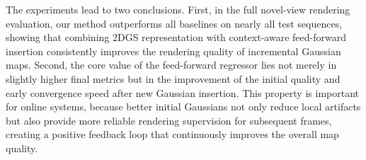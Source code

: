 \documentclass[letterpaper,journal]{IEEEtran}
\newcommand{\datasetname}[1]{\mbox{\normalfont\itshape #1}}
\begin{document}
\begin{table}[!t]
\centering
\caption{Ablation study on early convergence of the feed-forward regressor on \datasetname{hku\_campus\_00}. Values are averaged over valid training frames; bold indicates the better result at each step.}
\label{tab:ablation_curves}
\renewcommand{\arraystretch}{1.18}
\end{table}

The experiments lead to two conclusions. First, in the full novel-view rendering evaluation, our method outperforms all baselines on nearly all test sequences, showing that combining 2DGS representation with context-aware feed-forward insertion consistently improves the rendering quality of incremental Gaussian maps. Second, the core value of the feed-forward regressor lies not merely in slightly higher final metrics but in the improvement of the initial quality and early convergence speed after new Gaussian insertion. This property is important for online systems, because better initial Gaussians not only reduce local artifacts but also provide more reliable rendering supervision for subsequent frames, creating a positive feedback loop that continuously improves the overall map quality.

\end{document}
